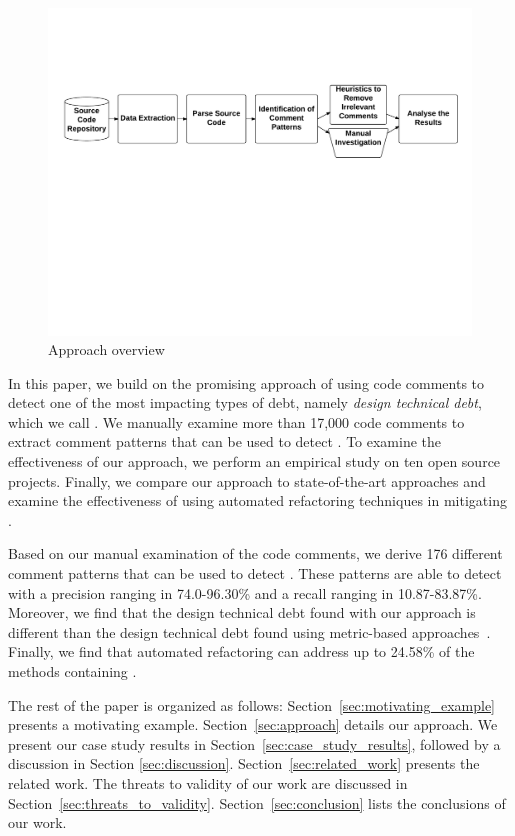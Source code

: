\begin{figure}[thb!]
    \centering
    \label{fig:approach}
    \includegraphics[width=1\textwidth]{figures/Approach2}
    \vspace{-10mm}
    \caption{Approach overview}
\end{figure}


In this paper, we build on the promising approach of using code comments to detect one of the most impacting types of debt, namely \emph{design technical debt}, which we call \SADTD. We manually examine more than 17,000 code comments to extract comment patterns that can be used to detect \SADTD. To examine the effectiveness of our approach, we perform an empirical study on ten open source projects. Finally, we compare our approach to state-of-the-art approaches and examine the effectiveness of using automated refactoring techniques in mitigating \SADTD.

Based on our manual examination of the code comments, we derive 176 different comment patterns that can be used to detect \SADTD. These patterns are able to detect \SADTD with a precision ranging in 74.0-96.30\% and a recall ranging in 10.87-83.87\%. Moreover, we find that the design technical debt found with our approach is different than the design technical debt found using metric-based approaches~\cite{Zazworka2013CSE}. Finally, we find that automated refactoring can address up to 24.58\% of the methods containing \SADTD.



The rest of the paper is organized as follows:  Section~\ref{sec:motivating_example} presents a motivating example. Section~\ref{sec:approach} details our approach. We present our case study results in Section~\ref{sec:case_study_results}, followed by a discussion in Section \ref{sec:discussion}. Section~\ref{sec:related_work} presents the related work. The threats to validity of our work are discussed in Section~\ref{sec:threats_to_validity}. Section~\ref{sec:conclusion} lists the conclusions of our work.